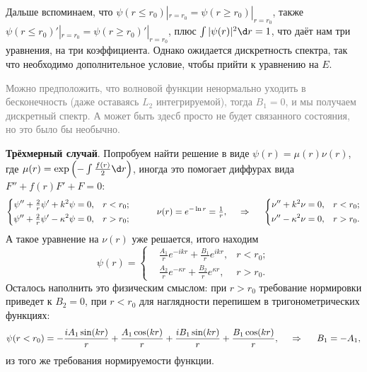 Дальше вспоминаем, что $\psi(r \leq r_0) |_{r=r_0} = \psi(r \geq r_0) |_{r=r_0}$, также $\psi(r \leq r_0)' |_{r=r_0} = \psi(r \geq r_0)' |_{r=r_0}$, плюс $\int |\psi(r)|^2 \d r = 1$, что даёт нам три уравнения, на три коэффициента. Однако ожидается дискретность спектра, так что необходимо дополнительное условие, чтобы прийти к уравнению на $E$. 

\textcolor{gray}{
Можно предположить, что волновой функции ненормально уходить в бесконечность (даже оставаясь $L_2$ интегрируемой), тогда $B_1 = 0$, и мы получаем дискретный спектр. А может быть здесб просто не будет связанного состояния, но это было бы необычно. 
}


















\textbf{Трёхмерный случай}. Попробуем найти решение в виде $\psi(r) = \mu(r) \nu(r)$, где $\mu(r) = \exp\left(
    - \int \frac{f(r)}{2} \d r
\right)$, иногда это помогает диффурах вида $F'' + f(r) F' + F = 0$:
\begin{equation*}
    \left\{\begin{aligned}
        \psi'' + \tfrac{2}{r} \psi' + k^2 \psi &= 0,  &r < r_0; \\
        \psi'' + \tfrac{2}{r} \psi' - \kappa^2 \psi &= 0, &r > r_0;
    \end{aligned}\right.
    \hspace{10 mm} 
    \nu(r) = e^{- \ln r} = \tfrac{1}{r},
    \hspace{0.5cm} \Rightarrow \hspace{0.5cm}
    \left\{\begin{aligned}
         \nu'' + k^2 \nu &= 0,  &r < r_0; \\
         \nu'' - \kappa^2 \nu &= 0, &r > r_0.
    \end{aligned}\right.
\end{equation*}
А такое уравнение на $\nu(r)$ уже решается, итого находим
\begin{equation*}
    \psi(r) = \left\{\begin{aligned}
        &\tfrac{A_1}{r} e^{- i k r} + \tfrac{B_1}{r} e^{i k r}, &r<r_0; \\
        &\tfrac{A_2}{r} e^{- \kappa r} + \tfrac{B_2}{r} e^{\kappa r}, &r>r_0.
    \end{aligned}\right.
\end{equation*}
Осталось наполнить это физическим смыслом: при $r > r_0$ требование нормировки приведет к $B_2 = 0$, при $r < r_0$ для наглядности перепишем в тригонометрических функциях:
\begin{equation*}
    \psi(r < r_0) = -\frac{i A_1 \sin (k r)}{r}+\frac{A_1 \cos (k r)}{r}+\frac{i B_1 \sin (k r)}{r}+\frac{B_1 \cos (k r)}{r},
    \hspace{0.5cm} \Rightarrow \hspace{0.5cm}
    B_1 = -A_1,
\end{equation*}
из того же требования нормируемости функции. 

